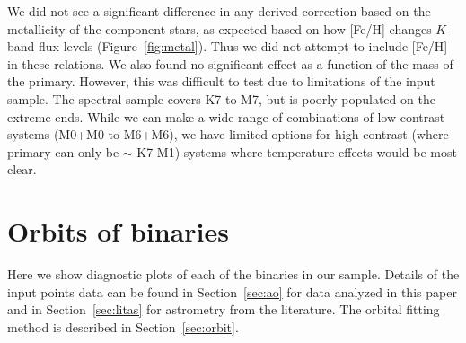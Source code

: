 \documentclass[twocolumn]{aastex62}
\begin{document}
We did not see a significant difference in any derived correction based on the metallicity of the component stars, as expected based on how [Fe/H] changes $K$-band flux levels (Figure~\ref{fig:metal}). Thus we did not attempt to include [Fe/H] in these relations. We also found no significant effect as a function of the mass of the primary. However, this was difficult to test due to limitations of the input sample. The \citet{Mann2015b} spectral sample covers K7 to M7, but is poorly populated on the extreme ends. While we can make a wide range of combinations of low-contrast systems (M0+M0 to M6+M6), we have limited options for high-contrast (where primary can only be $\sim$ K7-M1) systems where temperature effects would be most clear.

\clearpage

\section{Orbits of binaries}\label{sec:orbitplots}

Here we show diagnostic plots of each of the binaries in our sample. Details of the input points data can be found in Section~\ref{sec:ao} for data analyzed in this paper and in Section~\ref{sec:litas} for astrometry from the literature. The orbital fitting method is described in Section~\ref{sec:orbit}.
\end{document}

